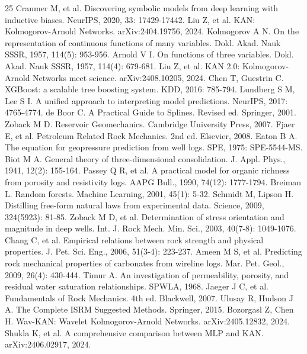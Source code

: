 \documentclass[final,3p,times,twocolumn]{elsarticle}
\begin{document}
\begin{thebibliography}{25}
 Cranmer M, et al. Discovering symbolic models from deep learning with inductive biases. NeurIPS, 2020, 33: 17429-17442.
 Liu Z, et al. KAN: Kolmogorov-Arnold Networks. arXiv:2404.19756, 2024.
 Kolmogorov A N. On the representation of continuous functions of many variables. Dokl. Akad. Nauk SSSR, 1957, 114(5): 953-956.
 Arnold V I. On functions of three variables. Dokl. Akad. Nauk SSSR, 1957, 114(4): 679-681.
 Liu Z, et al. KAN 2.0: Kolmogorov-Arnold Networks meet science. arXiv:2408.10205, 2024.
 Chen T, Guestrin C. XGBoost: a scalable tree boosting system. KDD, 2016: 785-794.
 Lundberg S M, Lee S I. A unified approach to interpreting model predictions. NeurIPS, 2017: 4765-4774.
 de Boor C. A Practical Guide to Splines. Revised ed. Springer, 2001.
 Zoback M D. Reservoir Geomechanics. Cambridge University Press, 2007.
 Fjaer E, et al. Petroleum Related Rock Mechanics. 2nd ed. Elsevier, 2008.
 Eaton B A. The equation for geopressure prediction from well logs. SPE, 1975: SPE-5544-MS.
 Biot M A. General theory of three-dimensional consolidation. J. Appl. Phys., 1941, 12(2): 155-164.
 Passey Q R, et al. A practical model for organic richness from porosity and resistivity logs. AAPG Bull., 1990, 74(12): 1777-1794.
 Breiman L. Random forests. Machine Learning, 2001, 45(1): 5-32.
 Schmidt M, Lipson H. Distilling free-form natural laws from experimental data. Science, 2009, 324(5923): 81-85.
 Zoback M D, et al. Determination of stress orientation and magnitude in deep wells. Int. J. Rock Mech. Min. Sci., 2003, 40(7-8): 1049-1076.
 Chang C, et al. Empirical relations between rock strength and physical properties. J. Pet. Sci. Eng., 2006, 51(3-4): 223-237.
 Ameen M S, et al. Predicting rock mechanical properties of carbonates from wireline logs. Mar. Pet. Geol., 2009, 26(4): 430-444.
 Timur A. An investigation of permeability, porosity, and residual water saturation relationships. SPWLA, 1968.
 Jaeger J C, et al. Fundamentals of Rock Mechanics. 4th ed. Blackwell, 2007.
 Ulusay R, Hudson J A. The Complete ISRM Suggested Methods. Springer, 2015.
 Bozorgasl Z, Chen H. Wav-KAN: Wavelet Kolmogorov-Arnold Networks. arXiv:2405.12832, 2024.
 Shukla K, et al. A comprehensive comparison between MLP and KAN. arXiv:2406.02917, 2024.
\end{thebibliography}
\end{document}
